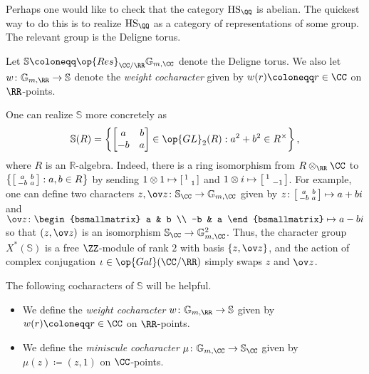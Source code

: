 \documentclass[../thesis.tex]{subfiles}
\begin{document}
Perhaps one would like to check that the category $\mathrm{HS}_\QQ$ is abelian. The quickest way to do this is to realize $\mathrm{HS}_\QQ$ as a category of representations of some group. The relevant group is the Deligne torus.
\begin{notation}
	Let $\mathbb S\coloneqq\op{Res}_{\CC/\RR}\mathbb G_{m,\CC}$ denote the Deligne torus. We also let $w\colon\mathbb G_{m,\RR}\to\mathbb S$ denote the \textit{weight cocharacter} given by $w(r)\coloneqq r\in\CC$ on $\RR$-points.
\end{notation}
\begin{remark} \label{rem:concrete-deligne-torus}
	One can realize $\mathbb S$ more concretely as
	\[\mathbb S(R)=\left\{\begin{bmatrix}
		a & b \\ -b & a
	\end{bmatrix}\in{\op{GL}_2(R)}:a^2+b^2\in R^\times\right\},\]
	where $R$ is an $\mathbb R$-algebra. Indeed, there is a ring isomorphism from $R\otimes_\RR\CC$ to $\left\{\begin{bsmallmatrix}
		a & b \\ -b & a
	\end{bsmallmatrix}:a,b\in R\right\}$ by sending $1\otimes1\mapsto\begin{bsmallmatrix}
		1 \\ & 1
	\end{bsmallmatrix}$ and $1\otimes i\mapsto\begin{bsmallmatrix}
		1 \\ & -1
	\end{bsmallmatrix}$. For example, one can define two characters $z,\ov z\colon\mathbb S_\CC\to\mathbb G_{m,\CC}$ given by $z\colon\begin{bsmallmatrix}
		a & b \\ -b & a
	\end{bsmallmatrix}\mapsto a+bi$ and $\ov z\colon\begin{bsmallmatrix}
		a & b \\ -b & a
	\end{bsmallmatrix}\mapsto a-bi$ so that $(z,\ov z)$ is an isomorphism $\mathbb S_\CC\to\mathbb G_{m,\CC}^2$. Thus, the character group $X^*(\mathbb S)$ is a free $\ZZ$-module of rank $2$ with basis $\{z,\ov z\}$, and the action of complex conjugation $\iota\in\op{Gal}(\CC/\RR)$ simply swaps $z$ and $\ov z$.
\end{remark}
\begin{example}
	The following cocharacters of $\mathbb S$ will be helpful.
	\begin{itemize}
		\item We define the \textit{weight cocharacter} $w\colon\mathbb G_{m,\RR}\to\mathbb S$ given by $w(r)\coloneqq r\in\CC$ on $\RR$-points.
		\item We define the \textit{miniscule cocharacter} $\mu\colon\mathbb G_{m,\CC}\to\mathbb S_\CC$ given by $\mu(z)\coloneqq(z,1)$ on $\CC$-points.
	\end{itemize}
\end{example}
\end{document}
